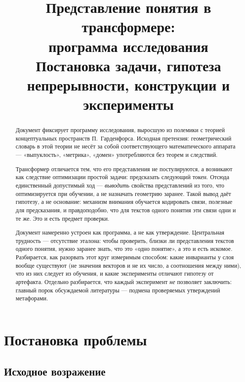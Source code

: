 \documentclass[11pt,a4paper]{article}
\title{\textbf{Представление понятия в трансформере:\\ программа исследования}\\[0.4em]
\large Постановка задачи, гипотеза непрерывности, конструкции и эксперименты}
\author{}
\date{}
\theoremstyle{definition}
\theoremstyle{plain}
\begin{document}
\maketitle

\begin{abstract}
\noindent
Документ фиксирует программу исследования, выросшую из полемики с теорией концептуальных
пространств П.~Гарденфорса. Исходная претензия: геометрический словарь в этой теории не несёт
за собой соответствующего математического аппарата — «выпуклость», «метрика», «домен»
употребляются без теорем и следствий.

Трансформер отличается тем, что его представления не постулируются, а возникают как следствие
оптимизации простой задачи: предсказать следующий токен. Отсюда единственный допустимый ход —
\emph{выводить} свойства представлений из того, что оптимизируется при обучении, а не назначать
геометрию заранее. Такой вывод даёт гипотезу, а не основание: механизм внимания обучается
кодировать связи, полезные для предсказания, и правдоподобно, что для текстов одного понятия
эти связи одни и те же. Это и есть предмет проверки.

Документ намеренно устроен как программа, а не как утверждение. Центральная трудность —
отсутствие эталона: чтобы проверить, близки ли представления текстов одного понятия, нужно
заранее знать, что это «одно понятие», а это и есть искомое. Разбирается, как разорвать этот
круг измеримым способом: какие инварианты у слоя вообще существуют (не значения векторов и не
их число, а соотношения между ними), что из них следует из обучения, и какие эксперименты
отличают гипотезу от артефакта. Отдельно разбирается, что каждый эксперимент \emph{не}
позволяет заключить: главный порок обсуждаемой литературы — подмена проверяемых утверждений
метафорами.
\end{abstract}

\tableofcontents
\bigskip

\section{Постановка проблемы}

\subsection{Исходное возражение}
\end{document}
